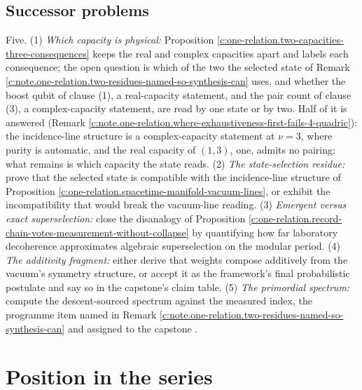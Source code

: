 \documentclass[11pt]{article}
\theoremstyle{definition}
\theoremstyle{plain}
\begin{document}
\subsection*{Successor problems}
\label{c:note.one-relation.setting-successor-problems}
Five. (1) \emph{Which capacity is physical:} Proposition \ref{c:one-relation.two-capacities-three-consequences} keeps the real and complex capacities apart and labels each consequence; the open question is which of the two the selected state of Remark \ref{c:note.one-relation.two-residues-named-so-synthesis-can} uses, and whether the boost qubit of clause (1), a real-capacity statement, and the pair count of clause (3), a complex-capacity statement, are read by one state or by two. Half of it is answered (Remark \ref{c:note.one-relation.where-exhaustiveness-first-fails-4-quadric}): the incidence-line structure is a complex-capacity statement at $\nu = 3$, where purity is automatic, and the real capacity of $(1,3)$, one, admits no pairing; what remains is which capacity the state reads. (2) \emph{The state-selection residue:} prove that the selected state is compatible with the incidence-line structure of Proposition \ref{c:one-relation.spacetime-manifold-vacuum-lines}, or exhibit the incompatibility that would break the vacuum-line reading. (3) \emph{Emergent versus exact superselection:} close the disanalogy of Proposition \ref{c:one-relation.record-chain-votes-measurement-without-collapse} by quantifying how far laboratory decoherence approximates algebraic superselection on the modular period. (4) \emph{The additivity fragment:} either derive that weights compose additively from the vacuum's symmetry structure, or accept it as the framework's final probabilistic postulate and say so in the capstone's claim table. (5) \emph{The primordial spectrum:} compute the descent-sourced spectrum against the measured index, the programme item named in Remark \ref{c:note.one-relation.two-residues-named-so-synthesis-can} and assigned to the capstone \cite{ButlerT17}.

\section{Position in the series}
\end{document}
